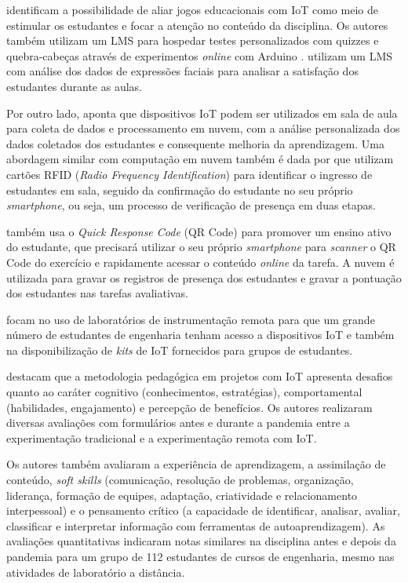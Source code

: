 \documentclass[portuguese]{textolivre}
\begin{document}
\textcite{petrovic_designing_2021} identificam a possibilidade de aliar jogos educacionais com IoT como meio de estimular os estudantes e focar a atenção no conteúdo da disciplina. Os autores também utilizam um LMS para hospedar testes personalizados com quizzes e quebra-cabeças através de experimentos \textit{online} com Arduino \cite{arduino_project_nodate}. \textcite{mahmood_raspberry_2019} utilizam um LMS com análise dos dados de expressões faciais para analisar a satisfação dos estudantes durante as aulas.

Por outro lado, \textcite{nai_design_2022} aponta que dispositivos IoT podem ser utilizados em sala de aula para coleta de dados e processamento em nuvem, com a análise personalizada dos dados coletados dos estudantes e consequente melhoria da aprendizagem. Uma abordagem similar com computação em nuvem também é dada por \textcite{tan_teaching_2018} que utilizam cartões RFID (\textit{Radio Frequency Identification}) para identificar o ingresso de estudantes em sala, seguido da confirmação do estudante no seu próprio \textit{smartphone}, ou seja, um processo de verificação de presença em duas etapas. 

\textcite{nai_design_2022} também usa o \textit{Quick Response Code} (QR Code) para promover um ensino ativo do estudante, que precisará utilizar o seu próprio \textit{smartphone} para \textit{scanner} o QR Code do exercício e rapidamente acessar o conteúdo \textit{online} da tarefa. A nuvem é utilizada para gravar os registros de presença dos estudantes e gravar a pontuação dos estudantes nas tarefas avaliativas.

\textcite{oteri_application_2020,fortoul-diaz_project-based_2021,hincapie_use_2020} focam no uso de laboratórios de instrumentação remota para que um grande número de estudantes de engenharia tenham acesso a dispositivos IoT e também na disponibilização de \textit{kits} de IoT fornecidos para grupos de estudantes. 

\textcite{fortoul-diaz_project-based_2021} destacam que a metodologia pedagógica em projetos com IoT apresenta desafios quanto ao caráter cognitivo (conhecimentos, estratégias), comportamental (habilidades, engajamento) e percepção de benefícios. Os autores realizaram diversas avaliações com formulários antes e durante a pandemia entre a experimentação tradicional e a experimentação remota com IoT.

Os autores também avaliaram a experiência de aprendizagem, a assimilação de conteúdo, \textit{soft skills} (comunicação, resolução de problemas, organização, liderança, formação de equipes, adaptação, criatividade e relacionamento interpessoal) e o pensamento crítico (a capacidade de identificar, analisar, avaliar, classificar e interpretar informação com ferramentas de autoaprendizagem). As avaliações quantitativas indicaram notas similares na disciplina antes e depois da pandemia para um grupo de 112 estudantes de cursos de engenharia, mesmo nas atividades de laboratório a distância. 
\end{document}
